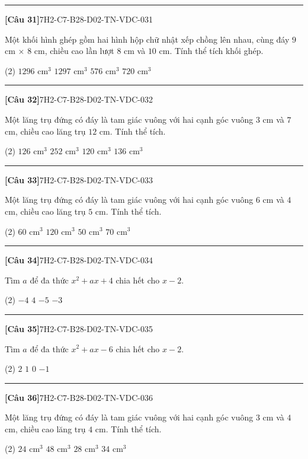 \documentclass[12pt,a4paper]{article}
\newif\ifloigiai
\newenvironment{cauhoi}[2]{%
  \par\medskip\noindent\rule{\textwidth}{0.4pt}\par\nopagebreak
  \noindent\textbf{[#1]}\hfill{\scriptsize\ttfamily #2}\par\nopagebreak\smallskip}{\par}
\newcommand{\dapan}[1]{\ifloigiai\par\smallskip\noindent\textit{Đáp án:} \textbf{#1}\par\fi}
\begin{document}
\begin{cauhoi}{Câu 31}{7H2-C7-B28-D02-TN-VDC-031}
Một khối hình ghép gồm hai hình hộp chữ nhật xếp chồng lên nhau, cùng đáy $9$ cm $\times$ $8$ cm, chiều cao lần lượt $8$ cm và $10$ cm. Tính thể tích khối ghép.
\begin{tasks}(2)
\task $1296\text{ cm}^3$
\task $1297\text{ cm}^3$
\task $576\text{ cm}^3$
\task $720\text{ cm}^3$
\end{tasks}
\dapan{A}
\end{cauhoi}
\begin{cauhoi}{Câu 32}{7H2-C7-B28-D02-TN-VDC-032}
Một lăng trụ đứng có đáy là tam giác vuông với hai cạnh góc vuông $3$ cm và $7$ cm, chiều cao lăng trụ $12$ cm. Tính thể tích.
\begin{tasks}(2)
\task $126\text{ cm}^3$
\task $252\text{ cm}^3$
\task $120\text{ cm}^3$
\task $136\text{ cm}^3$
\end{tasks}
\dapan{A}
\end{cauhoi}
\begin{cauhoi}{Câu 33}{7H2-C7-B28-D02-TN-VDC-033}
Một lăng trụ đứng có đáy là tam giác vuông với hai cạnh góc vuông $6$ cm và $4$ cm, chiều cao lăng trụ $5$ cm. Tính thể tích.
\begin{tasks}(2)
\task $60\text{ cm}^3$
\task $120\text{ cm}^3$
\task $50\text{ cm}^3$
\task $70\text{ cm}^3$
\end{tasks}
\dapan{A}
\end{cauhoi}
\begin{cauhoi}{Câu 34}{7H2-C7-B28-D02-TN-VDC-034}
Tìm $a$ để đa thức $x^{2}+ax+4$ chia hết cho $x-2$.
\begin{tasks}(2)
\task $-4$
\task $4$
\task $-5$
\task $-3$
\end{tasks}
\dapan{A}
\end{cauhoi}
\begin{cauhoi}{Câu 35}{7H2-C7-B28-D02-TN-VDC-035}
Tìm $a$ để đa thức $x^{2}+ax-6$ chia hết cho $x-2$.
\begin{tasks}(2)
\task $2$
\task $1$
\task $0$
\task $-1$
\end{tasks}
\dapan{B}
\end{cauhoi}
\begin{cauhoi}{Câu 36}{7H2-C7-B28-D02-TN-VDC-036}
Một lăng trụ đứng có đáy là tam giác vuông với hai cạnh góc vuông $3$ cm và $4$ cm, chiều cao lăng trụ $4$ cm. Tính thể tích.
\begin{tasks}(2)
\task $24\text{ cm}^3$
\task $48\text{ cm}^3$
\task $28\text{ cm}^3$
\task $34\text{ cm}^3$
\end{tasks}
\dapan{A}
\end{cauhoi}
\end{document}
